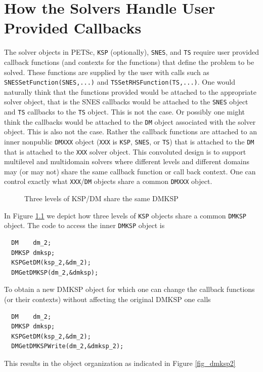 \chapter{How the Solvers Handle User Provided Callbacks}
\label{sec:dmksp}

The solver objects in PETSc, \lstinline{KSP} (optionally), \lstinline{SNES}, and
\lstinline{TS} require user provided callback functions (and contexts for the
functions) that define the problem to be solved. These functions are supplied by
the user with calls such as \lstinline{SNESSetFunction(SNES,...)}
and \lstinline{TSSetRHSFunction(TS,...)}. One would naturally think
that the functions provided would be attached to the appropriate
solver object, that is the SNES callbacks would be attached to the
\lstinline{SNES} object and \lstinline{TS} callbacks to the \lstinline{TS} object. This is not the
case. Or possibly one might think the callbacks would be attached to
the \lstinline{DM} object associated with the solver object. This is also not the
case. Rather the callback functions are attached to an inner nonpublic \lstinline{DMXXX} object
(\lstinline{XXX} is \lstinline{KSP}, \lstinline{SNES}, or \lstinline{TS}) that is attached to the \lstinline{DM} that is attached
to the \lstinline{XXX} solver object. This convoluted design is to support
multilevel and multidomain solvers where different levels and
different domains may (or may not) share the same callback function or call
back context. One can control exactly what \lstinline{XXX}/\lstinline{DM} objects share a common \lstinline{DMXXX} object.

\begin{figure}[hbt]
\centering
{}
  \caption{Three levels of KSP/DM share the same DMKSP}
\label{fig_dmksp}
\end{figure}

In Figure \ref{fig_dmksp} we depict how three levels of \lstinline{KSP} objects share a common \lstinline{DMKSP} object. The code to access the inner \lstinline{DMKSP} object is
\begin{lstlisting}
  DM    dm_2;
  DMKSP dmksp;
  KSPGetDM(ksp_2,&dm_2);
  DMGetDMKSP(dm_2,&dmksp);
\end{lstlisting}
To obtain a new DMKSP object for which one can change the callback functions (or their contexts) without affecting the original DMKSP one calls
\begin{lstlisting}
  DM    dm_2;
  DMKSP dmksp;
  KSPGetDM(ksp_2,&dm_2);
  DMGetDMKSPWrite(dm_2,&dmksp_2);
\end{lstlisting}
This results in the object organization as indicated in Figure \ref{fig_dmksp2}

